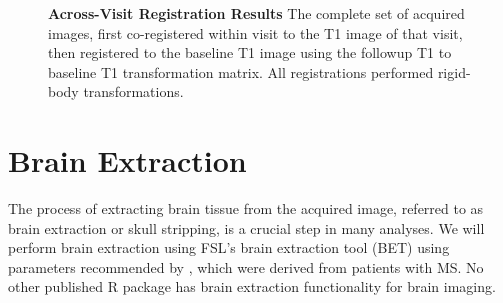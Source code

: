 \documentclass[a4paper]{report}\usepackage[]{graphicx}\usepackage[]{color}
\begin{document}
\begin{article}
\begin{figure}
{} \hspace*{-0.9em}
\hfill
\hfill
\hfill
\caption{{\bf Across-Visit Registration Results} The complete set of acquired images, first co-registered within visit to the T1 image of that visit, then registered to the baseline T1 image using the followup T1 to baseline T1 transformation matrix.  All registrations performed rigid-body transformations.}
\label{fig:reg_results}
\end{figure}



\section{Brain Extraction}
The process of extracting brain tissue from the acquired image, referred to as brain extraction or skull stripping, is a crucial step in many analyses.  We will perform brain extraction using FSL's brain extraction tool (BET) \citep{smith_fast_2002, jenkinson_bet2:_2005} using parameters recommended by \citet{popescu_optimizing_2012}, which were derived from patients with MS.  No other published R package has brain extraction functionality for brain imaging.  
 



\end{article}
\end{document}
